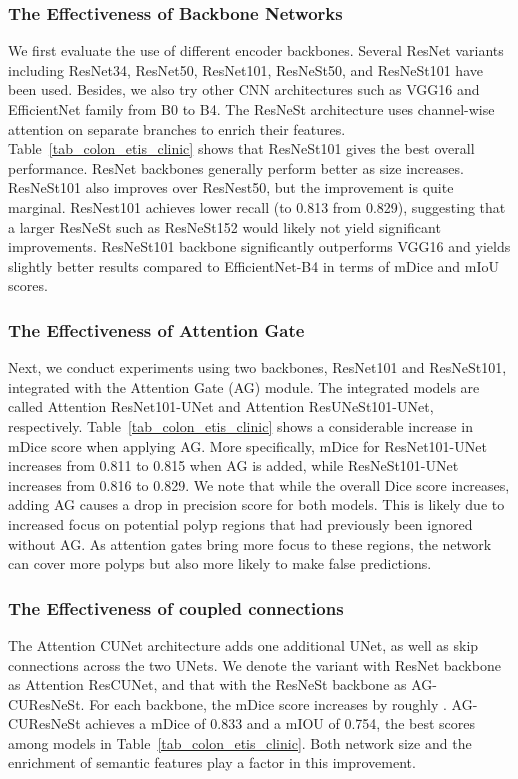 \documentclass[review, sort&compress]{elsarticle}
\begin{document}
	\subsubsection{The Effectiveness of Backbone Networks}
	We first evaluate the use of different encoder backbones. Several ResNet variants including ResNet34, ResNet50, ResNet101, ResNeSt50, and ResNeSt101 have been used. Besides, we also try other CNN architectures such as VGG16 and EfficientNet family from B0 to B4. The ResNeSt architecture uses channel-wise attention on separate branches to enrich their features. Table~\ref{tab_colon_etis_clinic} shows that ResNeSt101 gives the best overall performance. ResNet backbones generally perform better as size increases. ResNeSt101 also improves over ResNest50, but the improvement is quite marginal. ResNest101 achieves lower recall (to 0.813 from 0.829), suggesting that a larger ResNeSt such as ResNeSt152 would likely not yield significant improvements. ResNeSt101 backbone significantly outperforms VGG16 and yields slightly better results compared to EfficientNet-B4 in terms of mDice and mIoU scores.
	
	
	\subsubsection{The Effectiveness of Attention Gate}
	Next, we conduct experiments using two backbones, ResNet101 and ResNeSt101, integrated with the Attention Gate (AG) module. The integrated models are called Attention ResNet101-UNet and Attention ResUNeSt101-UNet, respectively. Table~\ref{tab_colon_etis_clinic} shows a considerable increase in mDice score when applying AG. More specifically, mDice for ResNet101-UNet increases from 0.811 to 0.815 when AG is added, while ResNeSt101-UNet increases from 0.816 to 0.829. We note that while the overall Dice score increases, adding AG causes a drop in precision score for both models. This is likely due to increased focus on potential polyp regions that had previously been ignored without AG. As attention gates bring more focus to these regions, the network can cover more polyps but also more likely to make false predictions.
	
	\subsubsection{The Effectiveness of coupled connections}
	The Attention CUNet architecture adds one additional UNet, as well as skip connections across the two UNets. We denote the variant with ResNet backbone as Attention ResCUNet, and that with the ResNeSt backbone as AG-CUResNeSt. For each backbone, the mDice score increases by roughly . AG-CUResNeSt achieves a mDice of 0.833 and a mIOU of 0.754, the best scores among models in Table~\eqref{tab_colon_etis_clinic}. Both network size and the enrichment of semantic features play a factor in this improvement.
	
\end{document}
